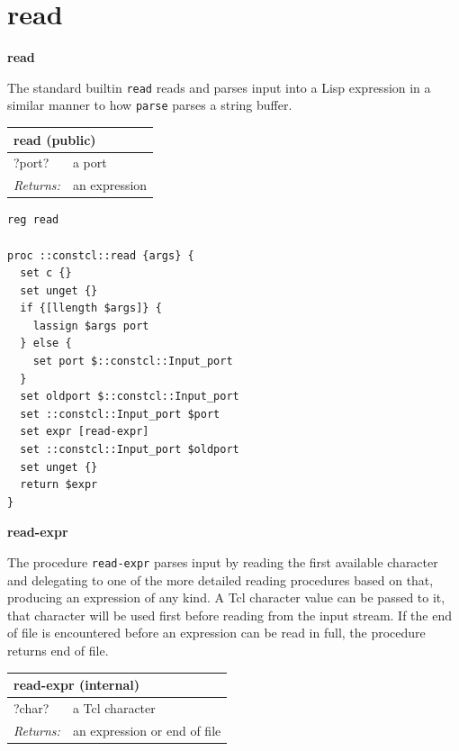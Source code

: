 \documentclass[twoside,9pt]{report}
\begin{document}
\section{read}
\label{read}

\textbf{read}


The standard builtin \texttt{read} reads and parses input into a Lisp expression in a similar manner to how \texttt{parse} parses a string buffer.

\begin{tabular}{ |l l| }
\hline
\multicolumn{2}{|l|}{read (public)} \\
\hline
?port? & a port \\
\textit{Returns:} & an expression \\
\hline
\end{tabular}

\noindent\makebox[\linewidth]{\rule{\linewidth}{0.4pt}}
\begin{lstlisting}
reg read
 
proc ::constcl::read {args} {
  set c {}
  set unget {}
  if {[llength $args]} {
    lassign $args port
  } else {
    set port $::constcl::Input_port
  }
  set oldport $::constcl::Input_port
  set ::constcl::Input_port $port
  set expr [read-expr]
  set ::constcl::Input_port $oldport
  set unget {}
  return $expr
}
\end{lstlisting}
\noindent\makebox[\linewidth]{\rule{\linewidth}{0.4pt}}

\textbf{read-expr}


The procedure \texttt{read-expr} parses input by reading the first available character and delegating to one of the more detailed reading procedures based on that, producing an expression of any kind. A Tcl character value can be passed to it, that character will be used first before reading from the input stream. If the end of file is encountered before an expression can be read in full, the procedure returns end of file.

\begin{tabular}{ |l l| }
\hline
\multicolumn{2}{|l|}{read-expr (internal)} \\
\hline
?char? & a Tcl character \\
\textit{Returns:} & an expression or end of file \\
\hline
\end{tabular}
\end{document}
